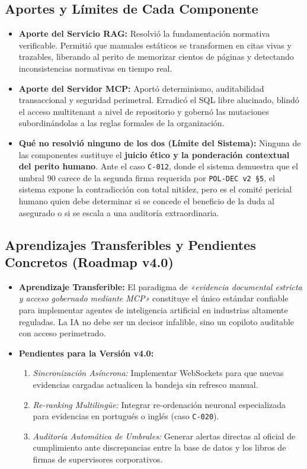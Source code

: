 \documentclass[11pt,letterpaper]{article}
\begin{document}
\subsection{Aportes y Límites de Cada Componente}
\begin{itemize}
    \item \textbf{Aporte del Servicio RAG:} Resolvió la fundamentación normativa verificable. Permitió que manuales estáticos se transformen en citas vivas y trazables, liberando al perito de memorizar cientos de páginas y detectando inconsistencias normativas en tiempo real.
    \item \textbf{Aporte del Servidor MCP:} Aportó determinismo, auditabilidad transaccional y seguridad perimetral. Erradicó el SQL libre alucinado, blindó el acceso multitenant a nivel de repositorio y gobernó las mutaciones subordinándolas a las reglas formales de la organización.
    \item \textbf{Qué no resolvió ninguno de los dos (Límite del Sistema):} Ninguna de las componentes sustituye el \textbf{juicio ético y la ponderación contextual del perito humano}. Ante el caso \texttt{C-012}, donde el sistema demuestra que el umbral 90 carece de la segunda firma requerida por \texttt{POL-DEC v2 §5}, el sistema expone la contradicción con total nitidez, pero es el comité pericial humano quien debe determinar si se concede el beneficio de la duda al asegurado o si se escala a una auditoría extraordinaria.
\end{itemize}

\subsection{Aprendizajes Transferibles y Pendientes Concretos (Roadmap v4.0)}
\begin{itemize}
    \item \textbf{Aprendizaje Transferible:} El paradigma de \textit{«evidencia documental estricta y acceso gobernado mediante MCP»} constituye el único estándar confiable para implementar agentes de inteligencia artificial en industrias altamente reguladas. La IA no debe ser un decisor infalible, sino un copiloto auditable con acceso perimetrado.
    \item \textbf{Pendientes para la Versión v4.0:}
    \begin{enumerate}
        \item \textit{Sincronización Asíncrona:} Implementar WebSockets para que nuevas evidencias cargadas actualicen la bandeja sin refresco manual.
        \item \textit{Re-ranking Multilingüe:} Integrar re-ordenación neuronal especializada para evidencias en portugués o inglés (caso \texttt{C-020}).
        \item \textit{Auditoría Automática de Umbrales:} Generar alertas directas al oficial de cumplimiento ante discrepancias entre la base de datos y los libros de firmas de supervisores corporativos.
    \end{enumerate}
\end{itemize}
\end{document}
